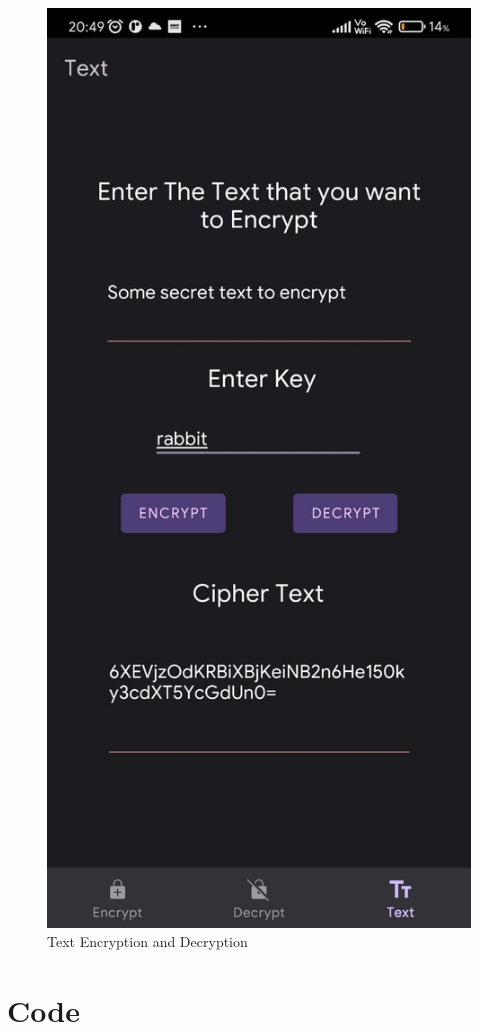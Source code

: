\documentclass[11pt]{article}
\begin{document}
\begin{figure}[H]
    \centering
    \includegraphics[width=.45\textwidth]{screenshots/WhatsApp Image 2023-11-20 at 20.50.02.jpeg}
    \caption{Text Encryption and Decryption}
\end{figure}

\section{Code}

\end{document}
